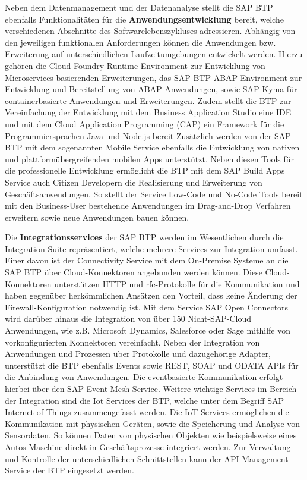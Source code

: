 Neben dem Datenmanagement und der Datenanalyse stellt die SAP BTP ebenfalls Funktionalitäten für die \textbf{Anwendungsentwicklung} bereit, welche verschiedenen Abschnitte des Softwarelebenszykluses adressieren. Abhängig von den jeweiligen funktionalen Anforderungen können die Anwendungen bzw. Erweiterung auf unterschiedlichen Laufzeitumgebungen entwickelt werden. Hierzu gehören die Cloud Foundry Runtime Environment zur Entwicklung von Microservices basierenden Erweiterungen, das SAP BTP ABAP Environment zur Entwicklung und Bereitstellung von ABAP Anwendungen, sowie SAP Kyma für containerbasierte Anwendungen und Erweiterungen. Zudem stellt die BTP zur Vereinfachung der Entwicklung mit dem Business Application Studio eine IDE und mit dem Cloud Application Programming (CAP) ein Framework für die Programmiersprachen Java und Node.js bereit \autocite[Vgl.][S. 67-69]{SEUBERT} Zusätzlich werden von der SAP BTP mit dem sogenannten Mobile Service ebenfalls die Entwicklung von nativen und plattformübergreifenden mobilen Apps unterstützt. \autocite[Vgl.][S. 217-219]{SEUBERT} Neben diesen Tools für die professionelle Entwicklung ermöglicht die BTP mit dem SAP Build Apps Service auch Citizen Developern die Realisierung und Erweiterung von Geschäftsanwendungen. So stellt der Service Low-Code und No-Code Tools bereit mit den Business-User bestehende Anwendungen im Drag-and-Drop Verfahren erweitern sowie neue Anwendungen bauen können. \autocite[Vgl.][S. 4]{SAPBUILDAPPS}

Die \textbf{Integrationsservices} der SAP BTP werden im Wesentlichen durch die Integration Suite repräsentiert, welche mehrere Services zur Integration umfasst. Einer davon ist der Connectivity Service mit dem On-Premise Systeme an die SAP BTP über Cloud-Konnektoren angebunden werden können. \autocite[Vgl.][]{CLOUDCONNECTOR} Diese Cloud-Konnektoren unterstützen HTTP und \ac{rfc}-Protokolle für die Kommunikation und haben gegenüber herkömmlichen Ansätzen den Vorteil, dass keine Änderung der Firewall-Konfiguration notwendig ist. Mit dem Service SAP Open Connectors wird darüber hinaus die Integration von über 150 Nicht-SAP-Cloud Anwendungen, wie z.B. Microsoft Dynamics, Salesforce oder Sage mithilfe von vorkonfigurierten Konnektoren vereinfacht. \autocite[Vgl.][S. 28]{INTEGRATIONSUITE2023} Neben der Integration von Anwendungen und Prozessen über Protokolle und dazugehörige Adapter, unterstützt die BTP ebenfalls Events sowie REST, SOAP und ODATA APIs für die Anbindung von Anwendungen. \autocite[Vgl.][]{BTPAPIS2023} Die eventbasierte Kommunikation erfolgt hierbei über den SAP Event Mesh Service.  \autocite[Vgl.][S. 4]{EVENTMESH2022} Weitere wichtige Services im Bereich der Integration sind die Iot Services der BTP, welche unter dem Begriff SAP Internet of Things zusammengefasst werden. \autocite[Vgl.][S. 163]{SEUBERT} Die IoT Services ermöglichen die Kommunikation mit physischen Geräten, sowie die Speicherung und Analyse von Sensordaten. So können Daten von physischen Objekten wie beispielsweise eines Autos Maschine direkt in Geschäftsprozesse integriert werden. \autocite[Vgl.][]{IOTBTP2023}  Zur Verwaltung und Kontrolle der unterschiedlichen Schnittstellen kann der API Management Service der BTP eingesetzt werden. \autocite[Vgl.][S. 72]{SEUBERT} 


